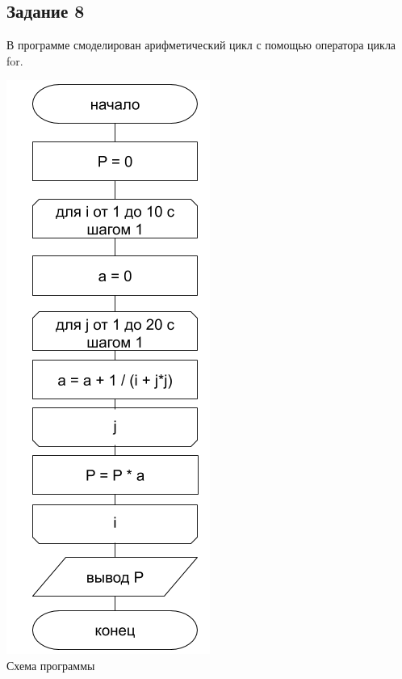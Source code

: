 \documentclass[a4paper,14pt]{extarticle}
\begin{document}
\subsection{Задание 8}
В программе смоделирован арифметический цикл с помощью оператора цикла for.
\begin{center}
\includegraphics[scale=0.6]{lab2-9.png}\\
Схема программы
\end{center}

\end{document}
